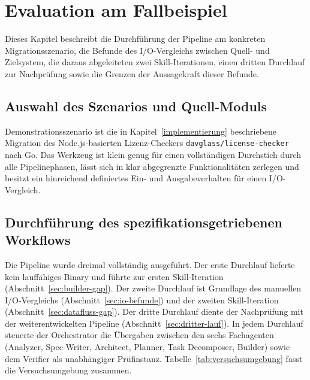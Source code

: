 \section{Evaluation am Fallbeispiel} \label{evaluation}

Dieses Kapitel beschreibt die Durchführung der Pipeline am konkreten Migrationsszenario, die Befunde des I/O-Vergleichs zwischen Quell- und Zielsystem, die daraus abgeleiteten zwei Skill-Iterationen, einen dritten Durchlauf zur Nachprüfung sowie die Grenzen der Aussagekraft dieser Befunde.

\subsection{Auswahl des Szenarios und Quell-Moduls}

Demonstrationsszenario ist die in Kapitel~\ref{implementierung} beschriebene Migration des Node.js-basierten Lizenz-Checkers \texttt{davglass/license-checker} nach Go. Das Werkzeug ist klein genug für einen vollständigen Durchstich durch alle Pipelinephasen, lässt sich in klar abgegrenzte Funktionalitäten zerlegen und besitzt ein hinreichend definiertes Ein- und Ausgabeverhalten für einen I/O-Vergleich.

\subsection{Durchführung des spezifikationsgetriebenen Workflows}

Die Pipeline wurde dreimal vollständig ausgeführt. Der erste Durchlauf lieferte kein lauffähiges Binary und führte zur ersten Skill-Iteration (Abschnitt~\ref{sec:builder-gap}). Der zweite Durchlauf ist Grundlage des manuellen I/O-Vergleichs (Abschnitt~\ref{sec:io-befunde}) und der zweiten Skill-Iteration (Abschnitt~\ref{sec:datafluss-gap}). Der dritte Durchlauf diente der Nachprüfung mit der weiterentwickelten Pipeline (Abschnitt~\ref{sec:dritter-lauf}). In jedem Durchlauf steuerte der Orchestrator die Übergaben zwischen den sechs Fachagenten (Analyzer, Spec-Writer, Architect, Planner, Task Decomposer, Builder) sowie dem Verifier als unabhängiger Prüfinstanz. Tabelle~\ref{tab:versuchsumgebung} fasst die Versuchsumgebung zusammen.

